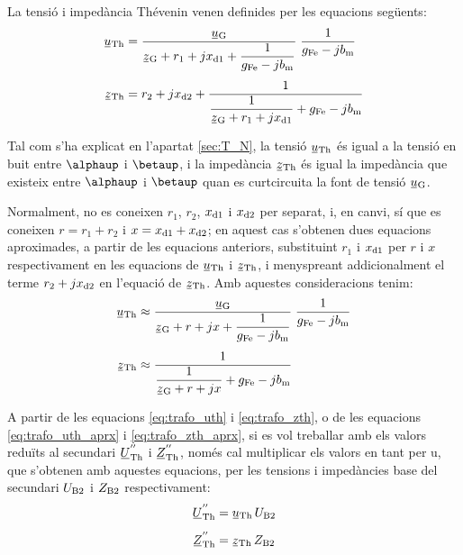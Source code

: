 La tensió i impedància Thévenin venen definides per les equacions
següents:
\begin{align}
    \cmplx{u}\ped{Th} &= \frac{\cmplx{u}\ped{G}}{\cmplx{z}\ped{G} + r_1 + j
    x\ped{d1} + \dfrac{1}{g\ped{Fe}-j b\ped{m}}} \;\frac{1}{g\ped{Fe}-j
    b\ped{m}} \label{eq:trafo_uth}\\[1ex]
    \cmplx{z}\ped{Th} &= r_2 + j x\ped{d2} + \frac{1}{\dfrac{1}{\cmplx{z}\ped{G} + r_1 +
    j x\ped{d1}} + g\ped{Fe}-j b\ped{m}}\label{eq:trafo_zth}
\end{align}

Tal com s'ha explicat en l'apartat \vref{sec:T_N}, la tensió
$\cmplx{u}\ped{Th}$ és igual a la tensió en buit entre $\alphaup$ i
$\betaup$, i la impedància $\cmplx{z}\ped{Th}$ és igual la impedància
que existeix entre $\alphaup$ i $\betaup$ quan es curtcircuita la font
de tensió $\cmplx{u}\ped{G}$.

Normalment, no es coneixen $r_1$, $r_2$, $x_\mathrm{d1}$ i $x_\mathrm{d2}$ per separat, i, en canvi, sí que es coneixen $r=r_1+r_2$ i $x=x_\mathrm{d1}+x_\mathrm{d2}$; en aquest
cas s'obtenen dues equacions aproximades, a partir de les equacions
anteriors, substituint $r_1$ i $x_\mathrm{d1}$ per $r$ i $x$ respectivament en
les equacions de $\cmplx{u}\ped{Th}$ i $\cmplx{z}\ped{Th}$, i
menyspreant addicionalment el terme $r_2 + j x_\mathrm{d2}$ en l'equació
de $\cmplx{z}\ped{Th}$. Amb aquestes consideracions tenim:
\begin{align}
    \cmplx{u}\ped{Th} &\approx \frac{\cmplx{u}\ped{G}}{\cmplx{z}\ped{G} + r + j
    x + \dfrac{1}{g\ped{Fe}-j b\ped{m}}} \;\frac{1}{g\ped{Fe}-j
    b\ped{m}} \label{eq:trafo_uth_aprx}\\[1ex]
    \cmplx{z}\ped{Th} &\approx \frac{1}{\dfrac{1}{\cmplx{z}\ped{G} + r +
    j x} + g\ped{Fe}-j b\ped{m}}\label{eq:trafo_zth_aprx}
\end{align}

A partir de les equacions \eqref{eq:trafo_uth} i
\eqref{eq:trafo_zth}, o de les equacions \eqref{eq:trafo_uth_aprx} i
\eqref{eq:trafo_zth_aprx}, si es vol treballar amb els valors
reduïts al secundari $\cmplx{U}\ped{Th}^{''}$ i
$\cmplx{Z}\ped{Th}^{''}$, només cal multiplicar els valors en tant per u, 
que s'obtenen amb aquestes equacions, per les tensions i impedàncies
base del secundari $U_\mathrm{B2}$ i $Z_\mathrm{B2}$ respectivament:
\begin{align}
    \cmplx{U}\ped{Th}^{''} &= \cmplx{u}\ped{Th} \, U\ped{B2} \\[1ex]
    \cmplx{Z}\ped{Th}^{''} &= \cmplx{z}\ped{Th} \, Z\ped{B2}
\end{align}


